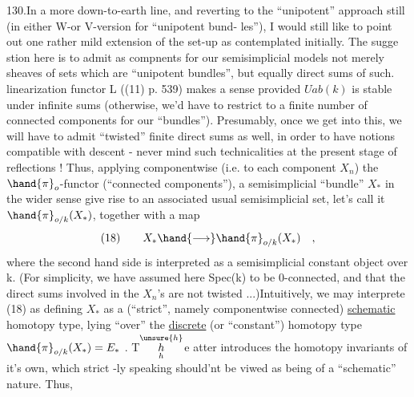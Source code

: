 
130.\qquad In a more down-to-earth line,  and  reverting to the
``unipotent'' approach still (in either W-or V-version for ``unipotent bund-%
les''),  I would still like to point out one rather mild extension of the
set-up as contemplated initially.  The sugge stion here is to admit as
compnents for our semisimplicial models not merely sheaves of sets which
are ``unipotent bundles'',  but equally  direct sums of such.  
   linearization functor L
((11) p. 539)   makes a sense\hand{,}   provided $Uab(k)$ is stable
under infinite sums (otherwise, we'd have to restrict to a finite number
of connected components for our ``bundles'').  Presumably,  once we get
into this,  we will have to admit ``twisted'' finite direct sums as well,
in order to have  notions compatible with descent  - never mind such
technicalities at the present stage of reflections !  Thus,  applying
componentwise (i.e. to each component $X_n$) the $\hand{\pi}_o$-functor (``connected
components''),  a semisimplicial ``bundle'' $X_{*}$ in the wider sense give rise
to an associated  usual semisimplicial set,  let's call it $\hand{\pi}_{o/k}(X_{*})$,
together with a map
\[ (18) \qquad X_{*} \hand{\longrightarrow} \hand{\pi}_{o/k}(X_{*}) \quad , \]
where the second hand side is interpreted as a semisimplicial constant
object over k.  (For simplicity,  we have assumed here Spec(k) to be
0-connected,  and that the direct sums involved in the $X_n$'s  are not
twisted ...)Intuitively,  we may interprete (18) as defining $X_{*}$ as a
(``strict'', namely componentwise connected) \uline{schematic} homotopy type,
lying ``over'' the \uline{discrete} (or ``constant'') homotopy type $\hand{\pi}_{o/k}(X_{*}) = E_{*}$ .
T$\overset{\unsure{h}}{\underset{h}{h}}$e atter introduces the homotopy invariants of it's own,  which strict%
-ly speaking should'nt be viwed as  being of a ``schematic'' nature.  Thus,
